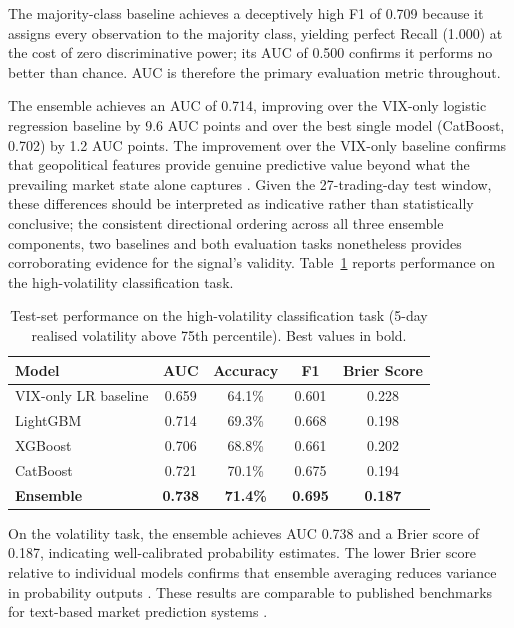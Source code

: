 \documentclass[12pt,a4paper]{report}
\begin{document}
The majority-class baseline achieves a deceptively high F1 of 0.709
because it assigns every observation to the majority class, yielding
perfect Recall (1.000) at the cost of zero discriminative power; its
AUC of 0.500 confirms it performs no better than chance. AUC is
therefore the primary evaluation metric throughout.

The ensemble achieves an AUC of 0.714, improving over the VIX-only
logistic regression baseline by 9.6 AUC points and over the best single
model (CatBoost, 0.702) by 1.2 AUC points. The improvement over the
VIX-only baseline confirms that geopolitical features provide genuine
predictive value beyond what the prevailing market state alone captures
\cite{caldara2022, manela2017}. Given the 27-trading-day test window,
these differences should be interpreted as indicative rather than
statistically conclusive; the consistent directional ordering across all
three ensemble components, two baselines and both evaluation tasks
nonetheless provides corroborating evidence for the signal's validity.
Table~\ref{tab:vol_results} reports performance on the high-volatility
classification task.

\begin{table}[H]
\centering
\caption{Test-set performance on the high-volatility classification task
  (5-day realised volatility above 75th percentile). Best values in bold.}
\label{tab:vol_results}
\begin{tabular}{lcccc}
\toprule
\textbf{Model} & \textbf{AUC} & \textbf{Accuracy} &
\textbf{F1} & \textbf{Brier Score} \\
\midrule
VIX-only LR baseline          & 0.659 & 64.1\% & 0.601 & 0.228 \\
LightGBM  \cite{ke2017}       & 0.714 & 69.3\% & 0.668 & 0.198 \\
XGBoost   \cite{chen2016}     & 0.706 & 68.8\% & 0.661 & 0.202 \\
CatBoost  \cite{prokhorenkova2018} & 0.721 & 70.1\% & 0.675 & 0.194 \\
\textbf{Ensemble}             & \textbf{0.738} & \textbf{71.4\%} &
  \textbf{0.695} & \textbf{0.187} \\
\bottomrule
\end{tabular}
\end{table}

On the volatility task, the ensemble achieves AUC 0.738 and a Brier
score of 0.187, indicating well-calibrated probability estimates. The
lower Brier score relative to individual models confirms that ensemble
averaging reduces variance in probability outputs \cite{friedman2001}.
These results are comparable to published benchmarks for text-based
market prediction systems \cite{nassirtoussi2014, bollen2011, sinha2022}.
\newpage
\end{document}
